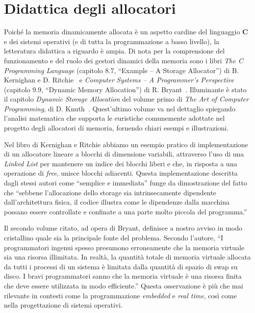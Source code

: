 \section{Didattica degli allocatori}

Poiché la memoria dinamicamente allocata è un aspetto cardine del linguaggio \textbf{C} e dei sistemi operativi (e di tutta la programmazione a basso livello), la letteratura didattica a riguardo è ampia. Di nota per la comprensione del funzionamento e del ruolo dei gestori dinamici della memoria sono i libri \textit{The C Programming Language} (capitolo 8.7, ``Example – A Storage Allocator'') di B. Kernighan e D. Ritchie~\cite{kernighan1988} e \textit{Computer Systems – A Programmer’s Perspective} (capitolo 9.9, ``Dynamic Memory Allocation'') di R. Bryant~\cite{bryant2015}. Illuminante è stato il capitolo \textit{Dynamic Storage Allocation} del volume primo di \textit{The Art of Computer Programming}, di D. Knuth~\cite{knuth1997}. Quest’ultimo volume va nel dettaglio spiegando l’analisi matematica che supporta le euristiche comunemente adottate nel progetto degli allocatori di memoria, fornendo chiari esempi e illustrazioni.

Nel libro di Kernighan e Ritchie abbiamo un esempio pratico di implementazione di un allocatore lineare a blocchi di dimensione variabili, attraverso l’uso di una \textit{Linked List} per mantenere un indice dei blocchi liberi e che, in risposta a una operazione di \textit{free}, unisce blocchi adiacenti. Questa implementazione descritta dagli stessi autori come ``semplice e immediata'' funge da dimostrazione del fatto che ``sebbene l’allocazione dello storage sia intrinsecamente dipendente dall’architettura fisica, il codice illustra come le dipendenze dalla macchina possano essere controllate e confinate a una parte molto piccola del programma.''

Il secondo volume citato, ad opera di Bryant, definisce a nostro avviso in modo cristallino quale sia la principale fonte del problema. Secondo l’autore, ``I programmatori ingenui spesso presumono erroneamente che la memoria virtuale sia una risorsa illimitata. In realtà, la quantità totale di memoria virtuale allocata da tutti i processi di un sistema è limitata dalla quantità di spazio di swap su disco. I bravi programmatori sanno che la memoria virtuale è una risorsa finita che deve essere utilizzata in modo efficiente.'' Questa osservazione è più che mai rilevante in contesti come la programmazione \textit{embedded} e \textit{real time}, così come nella progettazione di sistemi operativi.

